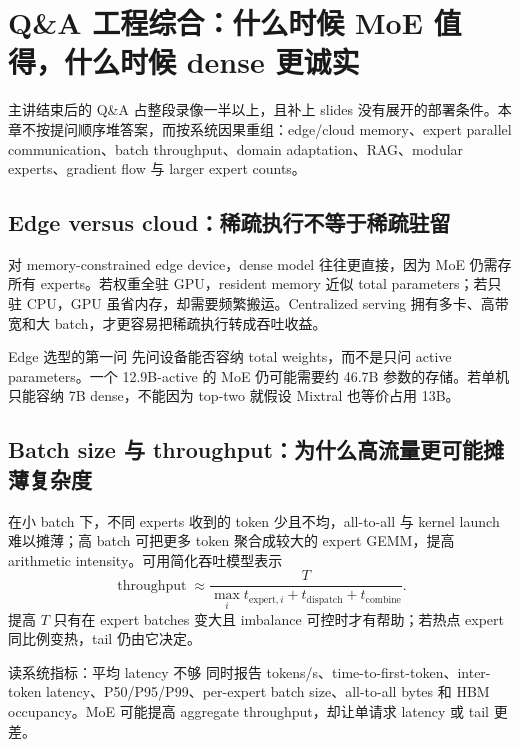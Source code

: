 \documentclass[a4paper]{article}
\begin{document}
\section{Q\&A 工程综合：什么时候 MoE 值得，什么时候 dense 更诚实}

主讲结束后的 Q\&A 占整段录像一半以上，且补上 slides 没有展开的部署条件。本章不按提问顺序堆答案，而按系统因果重组：edge/cloud memory、expert parallel communication、batch throughput、domain adaptation、RAG、modular experts、gradient flow 与 larger expert counts。

\subsection{Edge versus cloud：稀疏执行不等于稀疏驻留}

对 memory-constrained edge device，dense model 往往更直接，因为 MoE 仍需存所有 experts。若权重全驻 GPU，resident memory 近似 total parameters；若只驻 CPU，GPU 虽省内存，却需要频繁搬运。Centralized serving 拥有多卡、高带宽和大 batch，才更容易把稀疏执行转成吞吐收益。

\begin{importantbox}{Edge 选型的第一问}
先问设备能否容纳 total weights，而不是只问 active parameters。一个 12.9B-active 的 MoE 仍可能需要约 46.7B 参数的存储。若单机只能容纳 7B dense，不能因为 top-two 就假设 Mixtral 也等价占用 13B。
\end{importantbox}


\subsection{Batch size 与 throughput：为什么高流量更可能摊薄复杂度}

在小 batch 下，不同 experts 收到的 token 少且不均，all-to-all 与 kernel launch 难以摊薄；高 batch 可把更多 token 聚合成较大的 expert GEMM，提高 arithmetic intensity。可用简化吞吐模型表示
\[
\operatorname{throughput}\approx \frac{T}{\max_i t_{\text{expert},i}+t_{\text{dispatch}}+t_{\text{combine}}}.
\]
提高 $T$ 只有在 expert batches 变大且 imbalance 可控时才有帮助；若热点 expert 同比例变热，tail 仍由它决定。

\begin{knowledgebox}{读系统指标：平均 latency 不够}
同时报告 tokens/s、time-to-first-token、inter-token latency、P50/P95/P99、per-expert batch size、all-to-all bytes 和 HBM occupancy。MoE 可能提高 aggregate throughput，却让单请求 latency 或 tail 更差。
\end{knowledgebox}
\end{document}
